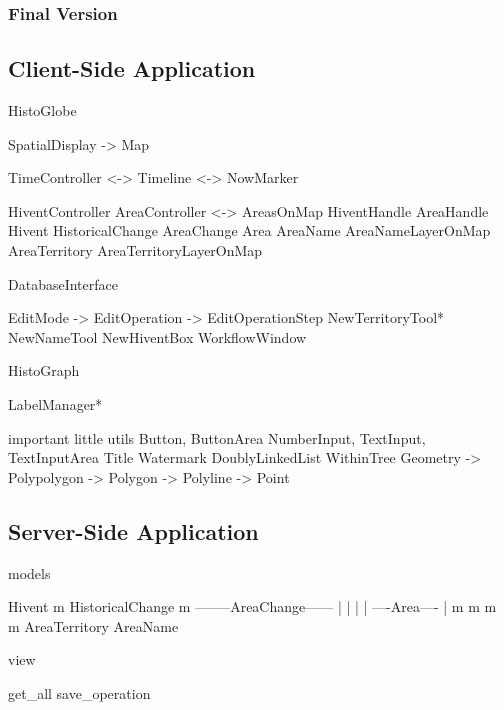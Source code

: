 
\subsubsection{Final Version} %
\label{ssub:final_version}




\subsection{Client-Side Application} %
\label{sub:client_side_application}



HistoGlobe

SpatialDisplay -> Map

TimeController  <-> Timeline
                <-> NowMarker

HiventController                AreaController <->  AreasOnMap
HiventHandle                    AreaHandle
Hivent
HistoricalChange    AreaChange  Area
                                AreaName            AreaNameLayerOnMap
                                AreaTerritory       AreaTerritoryLayerOnMap

DatabaseInterface

EditMode -> EditOperation -> EditOperationStep
NewTerritoryTool* NewNameTool NewHiventBox
WorkflowWindow

HistoGraph

LabelManager*

important little utils
  Button, ButtonArea
  NumberInput, TextInput, TextInputArea
  Title
  Watermark
  DoublyLinkedList
  WithinTree
  Geometry -> Polypolygon -> Polygon -> Polyline -> Point







\subsection{Server-Side Application} %
\label{sub:server_side_application}

models

           Hivent
             m
       HistoricalChange
             m
  --------AreaChange------
  |          |           |
  |     ----Area----     |
  m     m          m     m
AreaTerritory      AreaName


view

get\_all
save\_operation








